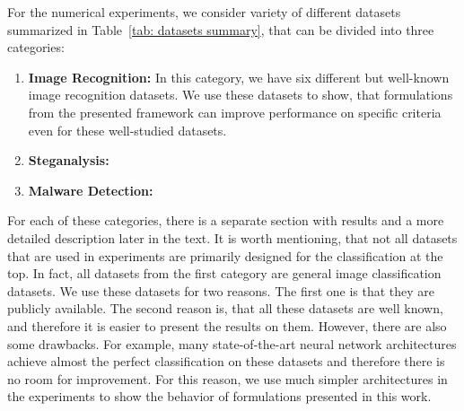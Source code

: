 For the numerical experiments, we consider variety of different datasets summarized in Table~\ref{tab: datasets summary}, that can be divided into three categories:
\begin{enumerate}
  \item \textbf{Image Recognition:} In this category, we have six different but well-known image recognition datasets. We use these datasets to show, that formulations from the presented framework can improve performance on specific criteria even for these well-studied datasets.
  \item \textbf{Steganalysis:}
  \item \textbf{Malware Detection:}
\end{enumerate}
For each of these categories, there is a separate section with results and a more detailed description later in the text. It is worth mentioning, that not all datasets that are used in experiments are primarily designed for the classification at the top. In fact, all datasets from the first category are general image classification datasets. We use these datasets for two reasons. The first one is that they are publicly available. The second reason is, that all these datasets are well known, and therefore it is easier to present the results on them. However, there are also some drawbacks. For example, many state-of-the-art neural network architectures achieve almost the perfect classification on these datasets and therefore there is no room for improvement. For this reason, we use much simpler architectures in the experiments to show the behavior of formulations presented in this work. 

